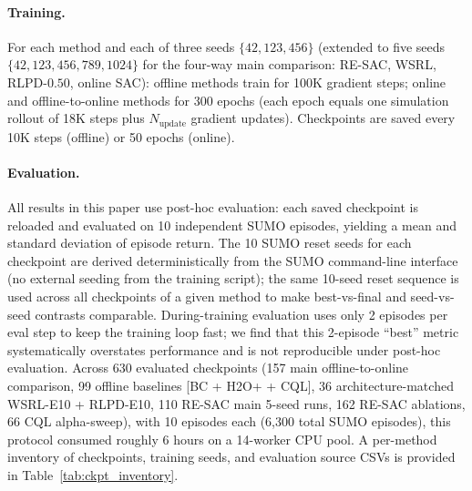 \documentclass[journal,10pt]{IEEEtran}
\begin{document}
\paragraph{Training.} For each method and each of three seeds $\{42, 123, 456\}$ (extended to five seeds $\{42, 123, 456, 789, 1024\}$ for the four-way main comparison: RE-SAC, WSRL, RLPD-$0.50$, online SAC): offline methods train for 100K gradient steps; online and offline-to-online methods for 300 epochs (each epoch equals one simulation rollout of 18K steps plus $N_{\text{update}}$ gradient updates). Checkpoints are saved every 10K steps (offline) or 50 epochs (online).

\paragraph{Evaluation.} All results in this paper use post-hoc evaluation: each saved checkpoint is reloaded and evaluated on 10 independent SUMO episodes, yielding a mean and standard deviation of episode return. The 10 SUMO reset seeds for each checkpoint are derived deterministically from the SUMO command-line interface (no external seeding from the training script); the same 10-seed reset sequence is used across all checkpoints of a given method to make best-vs-final and seed-vs-seed contrasts comparable. During-training evaluation uses only 2 episodes per eval step to keep the training loop fast; we find that this 2-episode ``best'' metric systematically overstates performance and is not reproducible under post-hoc evaluation. Across 630 evaluated checkpoints (157 main offline-to-online comparison, 99 offline baselines [BC + H2O+ + CQL], 36 architecture-matched WSRL-E10 + RLPD-E10, 110 RE-SAC main 5-seed runs, 162 RE-SAC ablations, 66 CQL alpha-sweep), with 10 episodes each (6{,}300 total SUMO episodes), this protocol consumed roughly 6 hours on a 14-worker CPU pool. A per-method inventory of checkpoints, training seeds, and evaluation source CSVs is provided in Table~\ref{tab:ckpt_inventory}.
\end{document}
